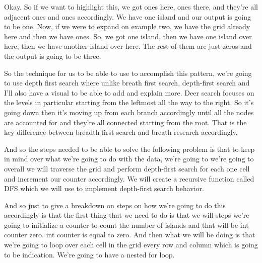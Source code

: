 \expandafter\def\csname sourceexcerpt@41\endcsname{%
Okay. So if we want to highlight this, we got ones here, ones there, and they're all
adjacent ones and ones accordingly. We have one island and our output is going to be
one. Now, if we were to expand on example two, we have the grid already here and then
we have ones. So, we got one island, then we have one island over here, then we have
another island over here. The rest of them are just zeros and the output is going to
be three.

So the technique for us to be able to use to accomplish this pattern, we're going to
use depth first search where unlike breath first search, depth-first search and I'll also
have a visual to be able to add and explain more. Deer search focuses on the levels in
particular starting from the leftmost all the way to the right. So it's going down
then it's moving up from each branch accordingly until all the nodes are accounted for
and they're all connected starting from the root. That is the key difference between
breadth-first search and breath research accordingly.

And so the steps needed to be able to solve the following problem is that to keep in
mind over what we're going to do with the data, we're going to we're going to overall
we will traverse the grid and perform depth-first search for each one cell and increment our
counter accordingly. We will create a recursive function called DFS which we will use
to implement depth-first search behavior.

And so just to give a breakdown on steps on how we're going to do this accordingly is
that the first thing that we need to do is that we will steps we're going to
initialize a counter to count the number of islands and that will be int counter zero.
int counter is equal to zero. And then what we will be doing is that we're going to
loop over each cell in the grid every row and column which is going to be indication.
We're going to have a nested for loop.
}

